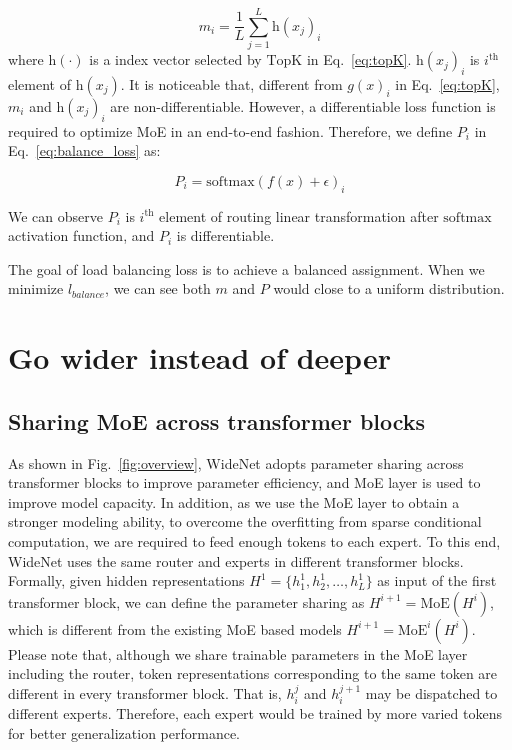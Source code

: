 \documentclass[letterpaper]{article} \usepackage{aaai22}  \usepackage{times}  \usepackage{helvet}  \usepackage{courier}  \usepackage[hyphens]{url}  \usepackage{graphicx} \urlstyle{rm} \def\UrlFont{\rm}  \usepackage{natbib}  \usepackage{caption} \DeclareCaptionStyle{ruled}{labelfont=normalfont,labelsep=colon,strut=off} \frenchspacing  \setlength{\pdfpagewidth}{8.5in}  \setlength{\pdfpageheight}{11in}  \usepackage{algorithm}
\begin{document}
\begin{equation}
m_i = \frac{1}{L} \sum_{j=1}^{L} \mathrm{h}(x_j)_i
\end{equation}
where $\mathrm{h}(\cdot)$ is a index vector selected by $\mathrm{TopK}$ in Eq.~\ref{eq:topK}. $\mathrm{h}(x_j)_i$ is $i^{\mathrm{th}}$ element of $\mathrm{h}(x_j)$. It is noticeable that, different from $g(x)_i$ in Eq.~\ref{eq:topK}, $m_i$ and $\mathrm{h}(x_j)_i$ are non-differentiable. However, a differentiable loss function is required to optimize MoE in an end-to-end fashion. Therefore, we define $P_i$ in Eq.~\ref{eq:balance_loss} as:

\begin{equation}
P_i = \mathrm{softmax}(f(x)+\epsilon)_i
\end{equation}

We can observe $P_i$ is $i^{\mathrm{th}}$ element of routing linear transformation after $\mathrm{softmax}$ activation function, and $P_i$ is differentiable. 

The goal of load balancing loss is to achieve a balanced assignment. When we minimize $l_{balance}$, we can see both $m$ and $P$ would close to a uniform distribution. 




\section{Go wider instead of deeper}
\label{sec:wide}


\subsection{Sharing MoE across transformer blocks}



As shown in Fig.~\ref{fig:overview}, WideNet adopts parameter sharing across transformer blocks to improve parameter efficiency, and MoE layer is used to improve model capacity. In addition, as we use the MoE layer to obtain a stronger modeling ability, to overcome the overfitting from sparse conditional computation, we are required to feed enough tokens to each expert. To this end, WideNet uses the same router and experts in different transformer blocks. Formally, given hidden representations $H^1=\{h_1^1,h_2^1,\dots,h_L^1\}$ as input of the first transformer block, we can define the parameter sharing as $H^{i+1}=\mathrm{MoE}(H^i)$, which is different from the existing MoE based models $H^{i+1}=\mathrm{MoE}^i(H^i)$. Please note that, although we share trainable parameters in the MoE layer including the router, token representations corresponding to the same token are different in every transformer block. That is, $h_i^j$ and $h_i^{j+1}$ may be dispatched to different experts. Therefore, each expert would be trained by more varied tokens for better generalization performance. 
\end{document}
